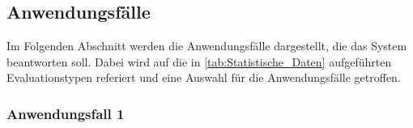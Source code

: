 


\subsection{Anwendungsfälle}
\label{chap:four_one_five}
Im Folgenden Abschnitt werden die Anwendungsfälle dargestellt, die das System beantworten soll. Dabei wird auf die in \autoref{tab:Statistische_Daten} aufgeführten
Evaluationstypen referiert und eine Auswahl für die Anwendungsfälle getroffen.
\subsubsection{Anwendungsfall 1}

